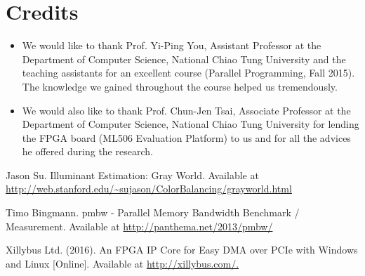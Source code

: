 \documentclass{acm_proc_article-sp}
\begin{document}
\section{Credits}
\begin{itemize}
\item We would like to thank Prof. Yi-Ping You, Assistant Professor at the Department of Computer Science, National Chiao Tung University and the teaching assistants for an excellent course (Parallel Programming, Fall 2015). The knowledge we gained throughout the course helped us tremendously.
\item We would also like to thank Prof. Chun-Jen Tsai, Associate Professor at the Department of Computer Science, National Chiao Tung University for lending the FPGA board (ML506 Evaluation Platform) to us and for all the advices he offered during the research.
\end{itemize}

\begin{thebibliography}{9}
Jason Su.
Illuminant Estimation: Gray World. 
Available at \url{http://web.stanford.edu/~sujason/ColorBalancing/grayworld.html}

Timo Bingmann.
pmbw - Parallel Memory Bandwidth Benchmark / Measurement.
Available at \url{http://panthema.net/2013/pmbw/}

Xillybus Ltd. (2016).
An FPGA IP Core for Easy DMA over PCIe with Windows and Linux [Online]. 
Available at \url{http://xillybus.com/.}
\end{thebibliography}
\end{document}
